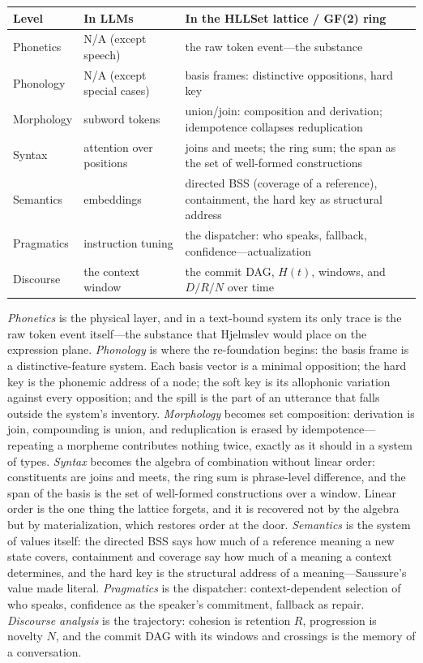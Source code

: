 \documentclass[11pt,a4paper]{article}
\theoremstyle{remark}
\begin{document}
\begin{center}
\begin{tabular}{@{}>{\raggedright\arraybackslash}p{2.0cm}
                    >{\raggedright\arraybackslash}p{2.4cm}
                    >{\raggedright\arraybackslash}p{10.4cm}@{}}
\toprule
Level & In LLMs & In the HLLSet lattice / GF(2) ring \\
\midrule
Phonetics & N/A (except speech) & the raw token event---the substance \\
Phonology & N/A (except special cases) & basis frames: distinctive oppositions, hard key \\
Morphology & subword tokens & union/join: composition and derivation; idempotence collapses reduplication \\
Syntax & attention over positions & joins and meets; the ring sum; the span as the set of well-formed constructions \\
Semantics & embeddings & directed BSS (coverage of a reference), containment, the hard key as structural address \\
Pragmatics & instruction tuning & the dispatcher: who speaks, fallback, confidence---actualization \\
Discourse & the context window & the commit DAG, $H(t)$, windows, and $D/R/N$ over time \\
\bottomrule
\end{tabular}
\end{center}

\emph{Phonetics} is the physical layer, and in a text-bound system its only
trace is the raw token event itself---the substance that Hjelmslev would place
on the expression plane. \emph{Phonology} is where the re-foundation begins:
the basis frame is a distinctive-feature system. Each basis vector is a minimal
opposition; the hard key is the phonemic address of a node; the soft key is its
allophonic variation against every opposition; and the spill is the part of an
utterance that falls outside the system's inventory. \emph{Morphology} becomes
set composition: derivation is join, compounding is union, and reduplication is
erased by idempotence---repeating a morpheme contributes nothing twice, exactly
as it should in a system of types. \emph{Syntax} becomes the algebra of
combination without linear order: constituents are joins and meets, the ring
sum is phrase-level difference, and the span of the basis is the set of
well-formed constructions over a window. Linear order is the one thing the
lattice forgets, and it is recovered not by the algebra but by materialization,
which restores order at the door. \emph{Semantics} is the system of values
itself: the directed BSS says how much of a reference meaning a new state
covers, containment and coverage say how much of a meaning a context
determines, and the hard key is the structural address
of a meaning---Saussure's value made literal. \emph{Pragmatics} is the
dispatcher: context-dependent selection of who speaks, confidence as the
speaker's commitment, fallback as repair. \emph{Discourse analysis} is the
trajectory: cohesion is retention $R$, progression is novelty $N$, and the
commit DAG with its windows and crossings is the memory of a conversation.
\end{document}
